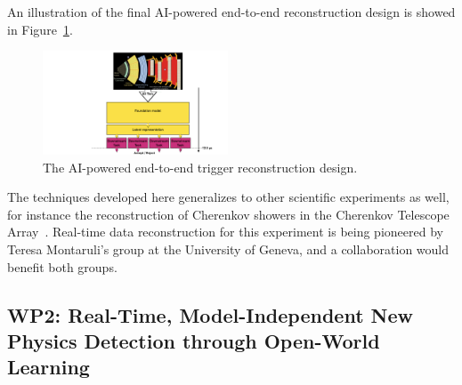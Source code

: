 \documentclass[12pt]{iopart}
\begin{document}
An illustration of the final AI-powered end-to-end reconstruction design is showed in Figure~\ref{fig:e2e}.

\begin{figure}[t!]
    \centering
    \includegraphics[width=0.49\textwidth]{figures/mlpf_foundation.pdf}
    \caption{The AI-powered end-to-end trigger reconstruction design.}
    \label{fig:e2e}
\end{figure}

The techniques developed here generalizes to other scientific experiments as well, for instance the reconstruction of Cherenkov showers in the Cherenkov Telescope Array~\cite{CTAObservatory2024}. Real-time data reconstruction for this experiment is being pioneered by Teresa Montaruli's group at the University of Geneva, and a collaboration would benefit both groups.


\subsection{WP2: Real-Time, Model-Independent New Physics Detection through Open-World Learning}


\end{document}
